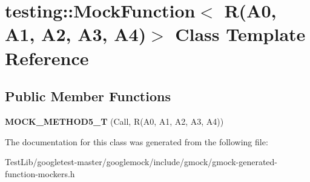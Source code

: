 \hypertarget{classtesting_1_1MockFunction_3_01R_07A0_00_01A1_00_01A2_00_01A3_00_01A4_08_4}{}\section{testing\+:\+:Mock\+Function$<$ R(A0, A1, A2, A3, A4)$>$ Class Template Reference}
\label{classtesting_1_1MockFunction_3_01R_07A0_00_01A1_00_01A2_00_01A3_00_01A4_08_4}
\subsection*{Public Member Functions}
\begin{DoxyCompactItemize}
\item 
\mbox{\label{classtesting_1_1MockFunction_3_01R_07A0_00_01A1_00_01A2_00_01A3_00_01A4_08_4_a572318905fea75f71338c120f7d1833d}} 
{\bfseries M\+O\+C\+K\+\_\+\+M\+E\+T\+H\+O\+D5\+\_\+T} (Call, R(A0, A1, A2, A3, A4))
\end{DoxyCompactItemize}


The documentation for this class was generated from the following file\+:\begin{DoxyCompactItemize}
\item 
Test\+Lib/googletest-\/master/googlemock/include/gmock/gmock-\/generated-\/function-\/mockers.\+h\end{DoxyCompactItemize}
